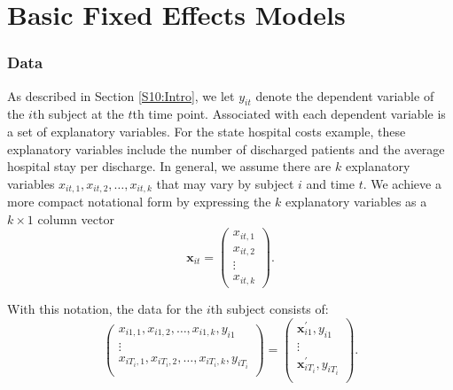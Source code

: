 \linejed

\section{Basic Fixed Effects Models}\label{S10:FEModels}

\subsubsection*{Data}

As described in Section \ref{S10:Intro}, we let $y_{it}$ denote the
dependent variable of the $i$th subject at the $t$th time point.
Associated with each dependent variable is a set of explanatory
variables. For the state hospital costs example, these explanatory
variables include the number of discharged patients and the average
hospital stay per discharge. In general, we assume there are $k$
explanatory variables $x_{it,1}, x_{it,2}, \ldots, x_{it,k}$ that
may vary by subject $i$ and time $t$. We achieve a more compact
notational form by expressing the $k$ explanatory variables as a $k
\times 1$ column vector
\begin{equation*}
\mathbf{x}_{it} = \left(\begin{array}{c}
  x_{it,1} \\
  x_{it,2} \\
  \vdots \\
 x_{it,k}
\end{array}\right) .
\end{equation*}

\noindent With this notation, the data for the $i$th subject
consists of:
\begin{equation*}
\left(\begin{array}{c}
  x_{i1,1},  x_{i1,2}, \ldots,  x_{i1,k}, y_{i1} \\
  \vdots \\
  x_{iT_i,1},  x_{iT_i,2}, \ldots,  x_{iT_i,k}, y_{iT_i} \\
\end{array}\right) = \left(\begin{array}{c}
  \mathbf{x}_{i1}^{\prime}, y_{i1} \\
  \vdots \\
  \mathbf{x}_{iT_i}^{\prime}, y_{iT_i} \\
\end{array}\right) .
\end{equation*}


